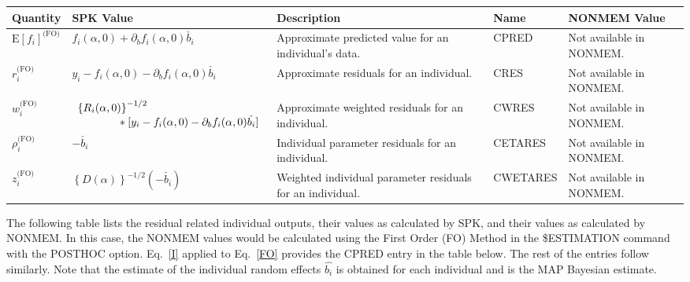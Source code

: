 \documentclass{article}
\begin{document}
\begin{center}
\begin{tabular}{|p{0.75in}|p{3.25in}|p{1.1in}|p{0.85in}|p{1.0in}|}
\hline
\hline
  {\bf Quantity}
    & {\bf SPK Value}
    & {\bf Description}
    & {\bf Name}
    & {\bf NONMEM Value} \\
  \hline
  \hline
  $\mbox{E} \left[ f_i \right]^{\mbox{(FO)}}$
    & $f_i(\alpha, 0)+ \partial_b f_i(\alpha, 0) \check{b_i}$
    & Approximate predicted value for an individual's data.
    & CPRED 
    & Not available in NONMEM. \\
  \hline
  $r^{\mbox{(FO)}}_i$
    & $y_i - f_i(\alpha, 0)- \partial_b f_i(\alpha, 0) \check{b_i}$
    & Approximate residuals for an individual.
    & CRES
    & Not available in NONMEM. \\
  \hline
  $w^{\mbox{(FO)}}_i$
    & $\begin{array}{l}
        \left\{ R_i(\alpha, 0) \right\}^{-1/2} \\
        \mbox{\hspace{0.5in}}
        \ast [ y_i - f_i(\alpha, 0)- \partial_b f_i(\alpha, 0) \check{b_i} ]
      \end{array} $
    & Approximate weighted residuals for an individual.
    & CWRES 
    & Not available in NONMEM. \\
  \hline
  $\rho^{\mbox{(FO)}}_i$
    & $-\check{b_i}$
    & Individual parameter residuals for an individual.
    & CETARES
    & Not available in NONMEM. \\
  \hline
  $z^{\mbox{(FO)}}_i$
    & $\left\{ D(\alpha) \right\}^{-1/2} ( - \check{b_i} )$
    & Weighted individual parameter residuals for an individual.
    & CWETARES
    & Not available in NONMEM. \\
  \hline
  \hline
\end{tabular}
\end{center}

The following table lists the residual related individual outputs, their
values as calculated by SPK, and their values as calculated by NONMEM.
In this case, the NONMEM values would be calculated using 
the First Order (FO) Method in the \$ESTIMATION command with 
the POSTHOC option. 
Eq.~\ref{I} applied to Eq.~\ref{FO} provides the CPRED entry in the table
below. The rest of the entries follow similarly.
Note that the estimate of the individual random
effects $\hat{b_i}$ is obtained for each individual and is the MAP Bayesian 
estimate.
\end{document}
